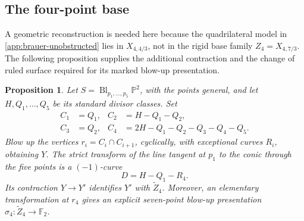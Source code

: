 \documentclass[11pt]{article}
\theoremstyle{plain}
\newtheorem{proposition}[proposition]{Proposition}
\theoremstyle{definition}
\theoremstyle{remark}
\newcommand{\Pp}{\mathbb P}
\newcommand{\F}{\mathbb F}
\newcommand{\Bl}{\operatorname{Bl}}
\begin{document}
\subsection{The four-point base}
\label{app:explicit-base-four}

A geometric reconstruction is needed here because the quadrilateral
model in \cref{app:brauer-unobstructed} lies in \(X_{4,4/3}\),
not in the rigid base family \(Z_4=X_{4,7/3}\). The following
proposition supplies the additional contraction and the change of ruled
surface required for its marked blow-up presentation.

\begin{proposition}\label{prop:explicit-base-four}
Let \(S=\Bl_{p_1,\ldots,p_5}\Pp^2\), with the points general, and
let \(H,Q_1,\ldots,Q_5\) be its standard divisor classes. Set
\[
\begin{aligned}
C_1&=Q_1,& C_2&=H-Q_1-Q_2,\\
C_3&=Q_2,& C_4&=2H-Q_1-Q_2-Q_3-Q_4-Q_5.
\end{aligned}
\]
Blow up the vertices \(r_i=C_i\cap C_{i+1}\), cyclically, with
exceptional curves \(R_i\), obtaining \(Y\). The strict transform
of the line tangent at \(p_1\) to the conic through the five points
is a \((-1)\)-curve
\[
D=H-Q_1-R_4.
\]
Its contraction \(Y\to Y'\) identifies \(Y'\) with
\(\widetilde Z_4\). Moreover, an elementary transformation at \(r_4\)
gives an explicit seven-point blow-up presentation
\(\sigma_4:\widetilde Z_4\to\F_2\).
\end{proposition}
\end{document}
